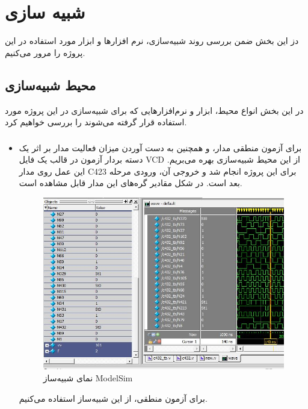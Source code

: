 \section{شبیه سازی}
دز این بخش ضمن بررسی روند شبیه‌سازی، نرم افزار‌ها و ابزار مورد استفاده در این پروژه را مرور می‌کنیم.
\subsection{محیط شبیه‌سازی}
در این بخش انواع محیط، ابزار و نرم‌افزارهایی که برای شبیه‌سازی در این پروژه مورد استفاده قرار گرفته می‌شوند را بررسی خواهیم کرد.
\begin{itemize}
	
	\item \subsubsection{}
	برای آزمون منطقی مدار، و همچنین به دست آوردن میزان فعالیت مدار بر اثر یک دسته بردار آزمون در قالب یک فایل VCD از این محیط شبیه‌سازی بهره می‌بریم. این عمل روی مدار C423 برای این پروژه انجام شد و خروجی آن، ورودی مرحله بعد است. در شکل مقادیر گره‌های این مدار قابل مشاهده است.
	\begin{figure}[H]
		\begin{center}
			\includegraphics[scale=0.6]{figs/modelsim.jpg}
			\caption{نمای شبیه‌ساز ModelSim} 
			\label{fig1}
		\end{center}
	\end{figure}
	برای آزمون منطقی، از این شبیه‌ساز استفاده می‌کنیم.
	
	
	

\end{itemize}
